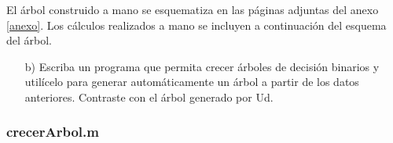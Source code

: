 \documentclass[11pt,a4paper,final]{article}
\begin{document}
El árbol construido a mano se esquematiza en las páginas adjuntas del anexo \ref{anexo}. 
Los cálculos realizados a mano se incluyen a continuación del esquema del árbol.

\begin{itemize}

   \item[b)] Escriba un programa que permita crecer árboles de decisión binarios y utilícelo para generar automáticamente un árbol a partir de los datos anteriores. Contraste con el árbol generado por Ud.
\end{itemize}


\subsubsection*{crecerArbol.m}
\end{document}

